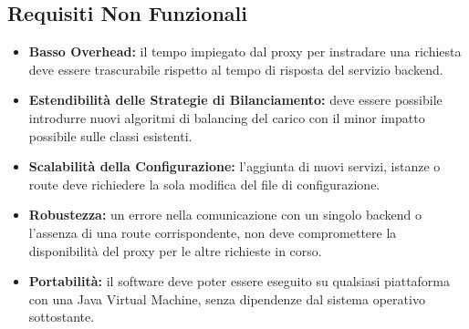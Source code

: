 \subsection{Requisiti Non Funzionali}
\begin{itemize}
    \item \textbf{Basso Overhead:} il tempo impiegato dal proxy per instradare una richiesta deve essere trascurabile rispetto al tempo di risposta del servizio backend.
    \item \textbf{Estendibilità delle Strategie di Bilanciamento:} deve essere possibile introdurre nuovi algoritmi di balancing del carico con il minor impatto possibile sulle classi esistenti.
    \item \textbf{Scalabilità della Configurazione:} l'aggiunta di nuovi servizi, istanze o route deve richiedere la sola modifica del file di configurazione.
    \item \textbf{Robustezza:} un errore nella comunicazione con un singolo backend o l'assenza di una route corrispondente,
      non deve compromettere la disponibilità del proxy per le altre richieste in corso.
    \item \textbf{Portabilità:} il software deve poter essere eseguito su qualsiasi piattaforma con una Java Virtual Machine, senza dipendenze dal sistema operativo sottostante.
\end{itemize}
